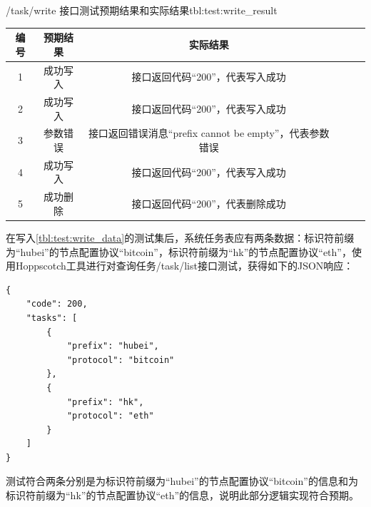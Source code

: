 \documentclass[supercite]{HustGraduPaper}
\newcommand{\rtbl}[1]{\autoref{tbl:#1}}
\theoremstyle{definition}
\begin{document}
\begin{generaltab}{/task/write 接口测试预期结果和实际结果}{tbl:test:write_result}
  \begin{tabular}{c|ccccc}
    \toprule
    编号      & 预期结果 & 实际结果       \\
    \midrule
    1        & 成功写入  &	接口返回代码“200”，代表写入成功	 \\
    2        & 成功写入  &	接口返回代码“200”，代表写入成功     \\
    3        & 参数错误  &  接口返回错误消息“prefix cannot be empty”，代表参数错误   \\
    4        & 成功写入  &  接口返回代码“200”，代表写入成功     \\
    5        & 成功删除  &  接口返回代码“200”，代表删除成功\\
    \bottomrule
  \end{tabular}
\end{generaltab}

在写入\rtbl{test:write_data}的测试集后，系统任务表应有两条数据：标识符前缀为“hubei”的节点配置协议“bitcoin”，标识符前缀为“hk”的节点配置协议“eth”，使用Hoppscotch工具进行对查询任务/task/list接口测试，获得如下的JSON响应：

\begin{verbatim}
{
    "code": 200,
    "tasks": [
        {
            "prefix": "hubei",
            "protocol": "bitcoin"
        },
        {
            "prefix": "hk",
            "protocol": "eth"
        }
    ]
}
\end{verbatim}

测试符合两条分别是为标识符前缀为“hubei”的节点配置协议“bitcoin”的信息和为标识符前缀为“hk”的节点配置协议“eth”的信息，说明此部分逻辑实现符合预期。
\end{document}
